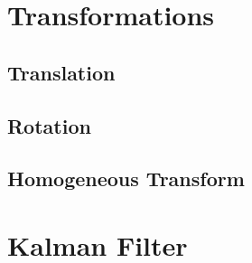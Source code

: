 \section{Transformations}
\label{sec:chapter1:transform}

\subsection{Translation}
\label{subsec:chapter1:transform:translation}

\subsection{Rotation}
\label{subsec:chapter1:transform:rotation}

\subsection{Homogeneous Transform}
\label{subsec:chapter1:transform:rototranslation}

\section{Kalman Filter}
\label{sec:chapter1:kf}
\nocite{intro-robotics}

